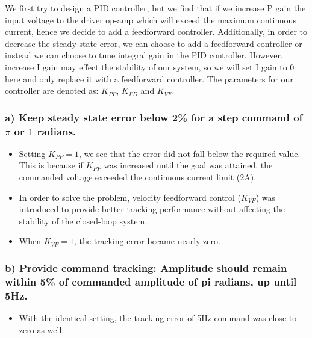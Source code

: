 \documentclass[letterpaper]{article}
\begin{document}
We first try to design a PID controller, but we find that if we increase P gain the input voltage to the driver op-amp which will exceed the maximum continuous current, hence we decide to add a feedforward controller. Additionally, in order to decrease the steady state error, we can choose to add a feedforward controller or instead we can choose to tune integral gain in the PID controller. However, increase I gain may effect the stability of our system, so we will set I gain to 0 here and only replace it with a feedforward controller. The parameters for our controller are denoted as: $K_{PP}$, $K_{PD}$ and $K_{VF}$.

\subsubsection*{a) Keep steady state error below 2\% for a step command of $\pi$ or $1$ radians.}
\begin{itemize}
\item Setting $K_{PP}=1$, we see that the error did not fall below the required value. This is because if $K_{PP}$ was increased until the goal was attained, the commanded voltage exceeded the continuous current limit (2A).

\item In order to solve the problem, velocity feedforward control ($K_{VF}$) was introduced to provide better tracking performance without affecting the stability of the closed-loop system.

\item When $K_{VF} = 1$, the tracking error became nearly zero. 
\end{itemize}

\subsubsection*{b) Provide command tracking: Amplitude should remain within 5\% of commanded amplitude of pi radians, up until 5Hz.}
\begin{itemize}
\item With the identical setting, the tracking error of 5Hz command was close to zero as well.    
\end{itemize}
\end{document}
